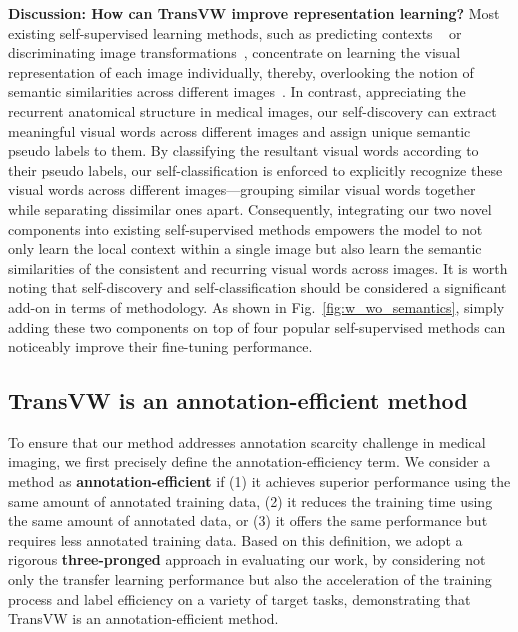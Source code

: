 \documentclass[journal,twoside,web]{ieeecolor}
\def\figurename{Fig.}
\begin{document}
\noindent\textbf{Discussion: How can TransVW improve representation learning?}
Most existing self-supervised learning methods, such as  predicting contexts ~\cite{pathak2016context,chen2019self,zhou2019models,Vincent2008Extracting} or discriminating image transformations~\cite{gidaris2018unsupervised,noroozi2016unsupervised,Zhuang2019Self,Jenni2020Steering}, concentrate on learning the visual representation of each image individually, thereby, overlooking the notion of semantic similarities across different images~\cite{Zhan2020Online,chaitanya2020contrastive}. In contrast, appreciating the recurrent anatomical structure in medical images, our self-discovery can extract meaningful visual words across different images and assign unique semantic pseudo labels to them. By classifying the resultant visual words according to their pseudo labels, our self-classification is enforced to explicitly recognize these visual words across different images—grouping similar visual words together while separating dissimilar ones apart. Consequently, integrating our two novel components into existing self-supervised methods empowers the model to not only learn the local context within a single image but also learn the semantic similarities of the consistent and recurring visual words across images. It is worth noting that self-discovery and self-classification should be considered a significant add-on in terms of methodology. As shown in \figurename~\ref{fig:w_wo_semantics}, simply adding these two components on top of four popular self-supervised methods can noticeably improve their fine-tuning performance.



\subsection{TransVW is an annotation-efficient method}
\label{sec:results_annotation_efficient}

To ensure  that our method addresses annotation scarcity challenge in medical imaging, we first precisely define the annotation-efficiency term.  We consider a method as \textbf{ annotation-efficient} if (1) it achieves superior performance using the same amount of annotated training data, (2) it reduces the training time using the same amount of annotated data, or (3) it offers the same performance but requires less annotated training data.
Based on this definition, we adopt a rigorous \textbf{three-pronged} approach in evaluating our work, by considering not only the transfer learning performance but also the acceleration of the training process and label efficiency on a variety of target tasks,
demonstrating that TransVW is an annotation-efficient method.
\end{document}
